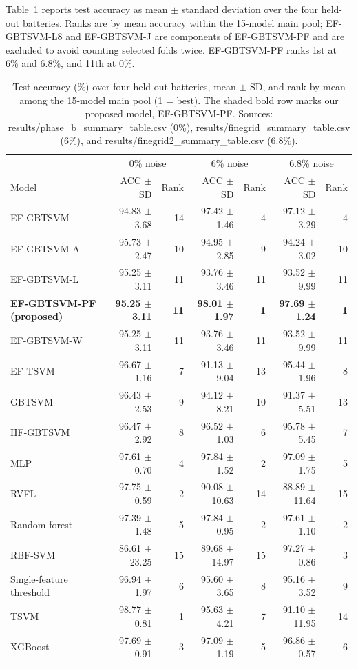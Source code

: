\documentclass[conference,a4paper]{IEEEtran}
\begin{document}
Table~\ref{tab:selected-results} reports test accuracy as mean $\pm$ standard deviation over the four held-out batteries. Ranks are by mean accuracy within the 15-model main pool; EF-GBTSVM-L8 and EF-GBTSVM-J are components of EF-GBTSVM-PF and are excluded to avoid counting selected folds twice. EF-GBTSVM-PF ranks 1st at 6\% and 6.8\%, and 11th at 0\%.

\begin{table}[!t]
\centering\small
\caption{Test accuracy (\%) over four held-out batteries, mean $\pm$ SD, and rank by mean among the 15-model main pool (1 = best). The shaded bold row marks our proposed model, EF-GBTSVM-PF. Sources: results/phase\_b\_summary\_table.csv (0\%), results/finegrid\_summary\_table.csv (6\%), and results/finegrid2\_summary\_table.csv (6.8\%).}
\label{tab:selected-results}
\begin{tabular}{lrr|rr|rr}
\toprule
& \multicolumn{2}{c}{0\% noise} & \multicolumn{2}{c}{6\% noise} & \multicolumn{2}{c}{6.8\% noise} \\
Model & ACC $\pm$ SD & Rank & ACC $\pm$ SD & Rank & ACC $\pm$ SD & Rank \\
\midrule
EF-GBTSVM & 94.83 $\pm$ 3.68 & 14 & 97.42 $\pm$ 1.46 & 4 & 97.12 $\pm$ 3.29 & 4 \\
EF-GBTSVM-A & 95.73 $\pm$ 2.47 & 10 & 94.95 $\pm$ 2.85 & 9 & 94.24 $\pm$ 3.02 & 10 \\
EF-GBTSVM-L & 95.25 $\pm$ 3.11 & 11 & 93.76 $\pm$ 3.46 & 11 & 93.52 $\pm$ 9.99 & 11 \\
\rowcolor{blue!10}\textbf{EF-GBTSVM-PF (proposed)} & \textbf{95.25 $\pm$ 3.11} & \textbf{11} & \textbf{98.01 $\pm$ 1.97} & \textbf{1} & \textbf{97.69 $\pm$ 1.24} & \textbf{1} \\
EF-GBTSVM-W & 95.25 $\pm$ 3.11 & 11 & 93.76 $\pm$ 3.46 & 11 & 93.52 $\pm$ 9.99 & 11 \\
EF-TSVM & 96.67 $\pm$ 1.16 & 7 & 91.13 $\pm$ 9.04 & 13 & 95.44 $\pm$ 1.96 & 8 \\
GBTSVM & 96.43 $\pm$ 2.53 & 9 & 94.12 $\pm$ 8.21 & 10 & 91.37 $\pm$ 5.51 & 13 \\
HF-GBTSVM & 96.47 $\pm$ 2.92 & 8 & 96.52 $\pm$ 1.03 & 6 & 95.78 $\pm$ 5.45 & 7 \\
MLP & 97.61 $\pm$ 0.70 & 4 & 97.84 $\pm$ 1.52 & 2 & 97.09 $\pm$ 1.75 & 5 \\
RVFL & 97.75 $\pm$ 0.59 & 2 & 90.08 $\pm$ 10.63 & 14 & 88.89 $\pm$ 11.64 & 15 \\
Random forest & 97.39 $\pm$ 1.48 & 5 & 97.84 $\pm$ 0.95 & 2 & 97.61 $\pm$ 1.10 & 2 \\
RBF-SVM & 86.61 $\pm$ 23.25 & 15 & 89.68 $\pm$ 14.97 & 15 & 97.27 $\pm$ 0.86 & 3 \\
Single-feature threshold & 96.94 $\pm$ 1.97 & 6 & 95.60 $\pm$ 3.65 & 8 & 95.16 $\pm$ 3.52 & 9 \\
TSVM & 98.77 $\pm$ 0.81 & 1 & 95.63 $\pm$ 4.21 & 7 & 91.10 $\pm$ 11.95 & 14 \\
XGBoost & 97.69 $\pm$ 0.91 & 3 & 97.09 $\pm$ 1.19 & 5 & 96.86 $\pm$ 0.57 & 6 \\
\bottomrule
\end{tabular}
\end{table}
\end{document}
